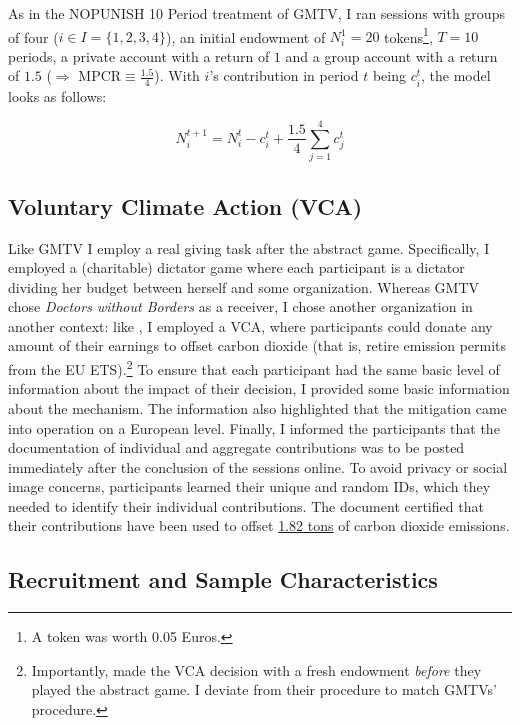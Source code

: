 \documentclass[
  authoryear,
  review,
  3p,
  onecolumn]{elsarticle}
\begin{document}
As in the NOPUNISH 10 Period treatment of GMTV, I ran sessions with
groups of four (\(i \in I=\{1,2,3,4\}\)), an initial endowment of
\(N_i^1 = 20\) tokens\footnote{A token was worth 0.05 Euros.}, \(T=10\)
periods, a private account with a return of \(1\) and a group account
with a return of \(1.5\) (\(\Rightarrow\) MPCR\(\equiv \frac{1.5}{4}\)).
With \(i\)'s contribution in period \(t\) being \(c_i^t\), the model
looks as follows:

\[
N_i^{t+1}=N_i^t - c_i^t + \frac{1.5}{4}\sum_{j=1}^4 c_j^t
\]

\hypertarget{voluntary-climate-action-vca}{%
\subsection{Voluntary Climate Action
(VCA)}\label{voluntary-climate-action-vca}}

Like GMTV I employ a real giving task after the abstract game.
Specifically, I employed a (charitable) dictator game where each
participant is a dictator dividing her budget between herself and some
organization. Whereas GMTV chose \emph{Doctors without Borders} as a
receiver, I chose another organization in another context: like
\citet{GKLS2020}, I employed a VCA, where participants could donate any
amount of their earnings to offset carbon dioxide (that is, retire
emission permits from the EU ETS).\footnote{Importantly,
  \citet{GKLS2020} made the VCA decision with a fresh endowment
  \emph{before} they played the abstract game. I deviate from their
  procedure to match GMTVs' procedure.} To ensure that each participant
had the same basic level of information about the impact of their
decision, I provided some basic information about the mechanism. The
information also highlighted that the mitigation came into operation on
a European level. Finally, I informed the participants that the
documentation of individual and aggregate contributions was to be posted
immediately after the conclusion of the sessions online. To avoid
privacy or social image concerns, participants learned their unique and
random IDs, which they needed to identify their individual
contributions. The document certified that their contributions have been
used to offset
\href{https://www.compensators.org/compensatelist/?searchterm=stefan+traub}{1.82
tons} of carbon dioxide emissions.

\hypertarget{sec-sample}{%
\subsection{Recruitment and Sample Characteristics}\label{sec-sample}}
\end{document}

